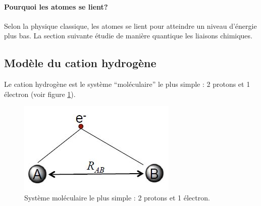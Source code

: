 \paragraph{Pourquoi les atomes se lient?}
Selon la physique classique, les atomes se lient
pour atteindre un niveau d'énergie plus bas.
La section suivante étudie de manière quantique
les liaisons chimiques.

\subsection{Modèle du cation hydrogène}
Le cation hydrogène est le système ``moléculaire''
le plus simple : 2 protons et 1 électron (voir figure 
\ref{fig:cation-h2}).

\begin{figure}[ht]
	\centering
	\includegraphics{img/cation_h2.jpg}
	\caption{Système moléculaire le plus simple : 2 protons
	et 1 électron.}
	\label{fig:cation-h2}
\end{figure}

